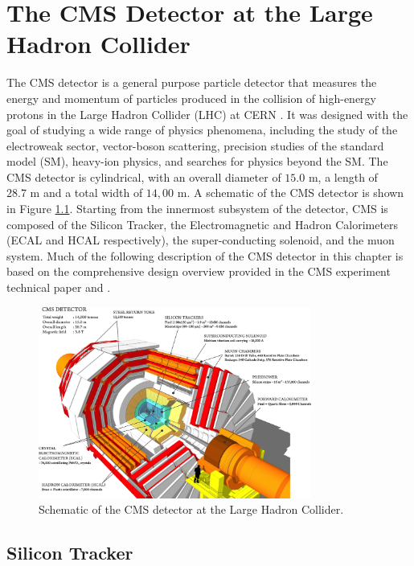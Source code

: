 \chapter{The CMS Detector at the Large Hadron Collider}
\label{chap:CMS}

The CMS detector is a general purpose particle detector that measures the energy and momentum of particles produced in the collision of high-energy protons in the Large Hadron Collider (LHC) at CERN \cite{collaborationCMSExperimentCERN2008}. It was designed with the goal of studying a wide range of physics phenomena, including the study of the electroweak sector, vector-boson scattering, precision studies of the standard model (SM), heavy-ion physics, and searches for physics beyond the SM. The CMS detector is cylindrical, with an overall diameter of $15.0 \text{ m}$, a length of $28.7 \text{ m}$ and a total width of $14,00\text{ m}$. A schematic of the CMS detector is shown in Figure \ref{fig:cms_detector}. Starting from the innermost subsystem of the detector, CMS is composed of the Silicon Tracker, the Electromagnetic and Hadron Calorimeters (ECAL and HCAL respectively), the super-conducting solenoid, and the muon system. Much of the following description of the CMS detector in this chapter is based on the comprehensive design overview provided in the CMS experiment technical paper \cite{collaborationCMSExperimentCERN2008} and \cite{collaborationDevelopmentCMSDetector2024}.

\begin{figure}[ht]
	\centering
	\includegraphics[width=0.8\textwidth]{images/cms_detector.png}
	\caption{Schematic of the CMS detector at the Large Hadron Collider.}
	\label{fig:cms_detector}
\end{figure}

\section{Silicon Tracker}
\label{sec:tracker}

